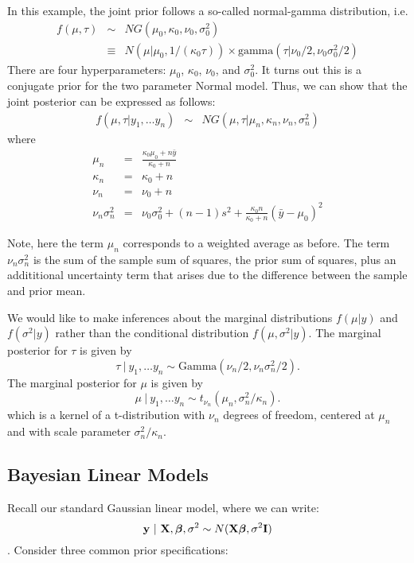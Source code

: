 In this example, the joint prior follows a so-called normal-gamma distribution, i.e.
\begin{eqnarray*}
f(\mu, \tau)  &\sim&  NG(\mu_0 ,\kappa_0, \nu_0, \sigma^2_0) \\
&\equiv& N(\mu | \mu_0, 1/(\kappa_0 \tau)) \times \mbox{gamma} (\tau | \nu_0/2 , \nu_0 \sigma^2_0/2) 
\end{eqnarray*}
There are four hyperparameters: $\mu_0$, $\kappa_0$, $\nu_0$, and $\sigma_0^2$.
It turns out this is a conjugate prior for the two parameter Normal model.
Thus, we can show that the joint posterior can be expressed as follows:
\begin{eqnarray*}
f(\mu, \tau | y_1, \ldots y_n)  &\sim&  NG(\mu, \tau | \mu_n ,\kappa_n, \nu_n, \sigma_n^2) 
\end{eqnarray*}
where
\begin{eqnarray*}
\mu_n &=& \frac{\kappa_0 \mu_0 + n {\bar y}}{\kappa_0 + n}\\
\kappa_n &=& \kappa_0 + n\\
\nu_n &=& \nu_0 + n \\
\nu_n \sigma_n^2 &=& \nu_0 \sigma_0^2 + (n-1) s^2 + \frac{\kappa_0 n}{\kappa_0 + n} (\bar y - \mu_0)^2
\end{eqnarray*}


Note, here the term $\mu_n$ corresponds to a weighted average as before.
The term $\nu_n \sigma_n^2$ is the sum of the sample sum of squares, the prior sum of squares, plus an addititional uncertainty term that arises due to the difference between the sample and prior mean.

We would like to make inferences about the marginal distributions $f(\mu | y)$ and $f(\sigma^2 | y)$ rather than the conditional distribution $f(\mu , \sigma^2 | y)$.
The marginal posterior for $\tau$ is given by
$$
\tau ~|~ y_1, \ldots y_n \sim \mbox{Gamma}(\nu_n/2, \nu_n \sigma_n^2/2).
$$
The marginal posterior for $\mu$ is given by
$$
\mu ~|~ y_1, \ldots y_n \sim t_{\nu_n}(\mu_n, \sigma_n^2/\kappa_n).
$$
which is a kernel of a t-distribution with $\nu_n$ degrees of freedom,
centered at $\mu_n$ and with scale parameter $\sigma_n^2/\kappa_n$.


\subsection{Bayesian Linear Models}

Recall our standard Gaussian linear model, where we can write:
$$\mathbf{y} ~|~ \mathbf{X}, \boldsymbol{\beta}, \sigma^2
\sim N(\mathbf{X} \boldsymbol{\beta}, \sigma^2 \mathbf{I})$$. Consider three common prior specifications:

